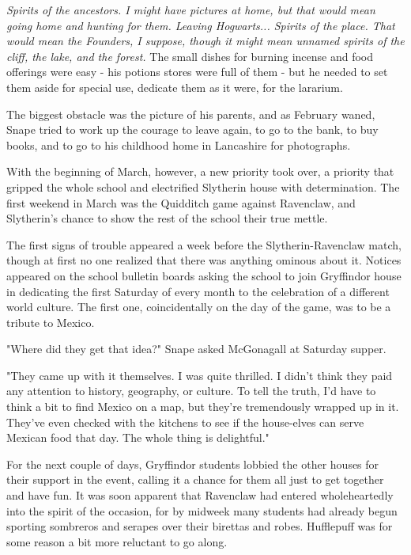 \emph{Spirits of the ancestors. I might have pictures at home, but that would mean going home and hunting for them. Leaving Hogwarts... Spirits of the place. That would mean the Founders, I suppose, though it might mean unnamed spirits of the cliff, the lake, and the forest.} The small dishes for burning incense and food offerings were easy - his potions stores were full of them - but he needed to set them aside for special use, dedicate them as it were, for the lararium.

The biggest obstacle was the picture of his parents, and as February waned, Snape tried to work up the courage to leave again, to go to the bank, to buy books, and to go to his childhood home in Lancashire for photographs.

With the beginning of March, however, a new priority took over, a priority that gripped the whole school and electrified Slytherin house with determination. The first weekend in March was the Quidditch game against Ravenclaw, and Slytherin's chance to show the rest of the school their true mettle.

The first signs of trouble appeared a week before the Slytherin-Ravenclaw match, though at first no one realized that there was anything ominous about it. Notices appeared on the school bulletin boards asking the school to join Gryffindor house in dedicating the first Saturday of every month to the celebration of a different world culture. The first one, coincidentally on the day of the game, was to be a tribute to Mexico.

"Where did they get that idea?" Snape asked McGonagall at Saturday supper.

"They came up with it themselves. I was quite thrilled. I didn't think they paid any attention to history, geography, or culture. To tell the truth, I'd have to think a bit to find Mexico on a map, but they're tremendously wrapped up in it. They've even checked with the kitchens to see if the house-elves can serve Mexican food that day. The whole thing is delightful."

For the next couple of days, Gryffindor students lobbied the other houses for their support in the event, calling it a chance for them all just to get together and have fun. It was soon apparent that Ravenclaw had entered wholeheartedly into the spirit of the occasion, for by midweek many students had already begun sporting sombreros and serapes over their birettas and robes. Hufflepuff was for some reason a bit more reluctant to go along.

